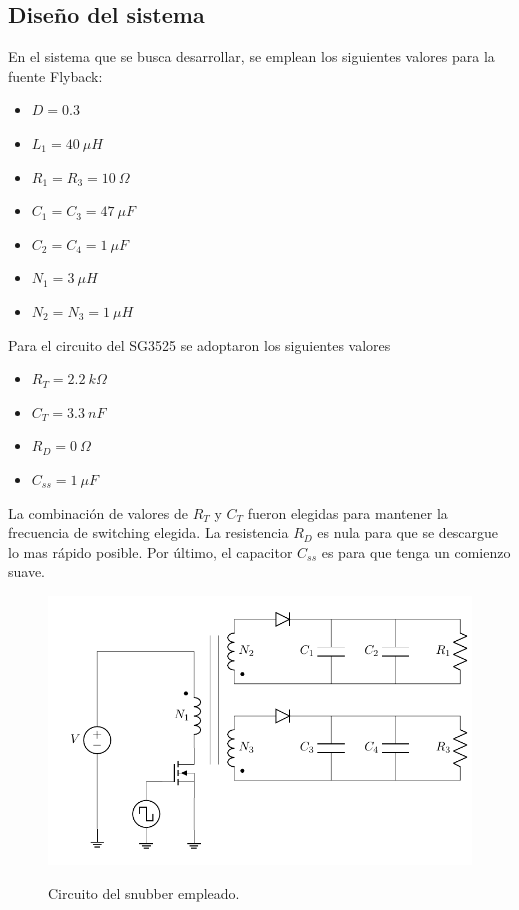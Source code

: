 %
%
%

\subsection{Diseño del sistema}

En el sistema que se busca desarrollar, se emplean los siguientes valores para la fuente Flyback:
\begin{multicols}{2}
\begin{itemize}
	\item $D = 0.3$
	\item $L_1 = 40 \ \mu H$
	\item $R_1 = R_3 = 10 \ \Omega$
	\item $C_1 = C_3 = 47 \ \mu F$
	\item $C_2 = C_4 = 1 \ \mu F$
	\item $N_1 = 3 \ \mu H$
	\item $N_2 = N_3 = 1 \ \mu H$
\end{itemize}
\end{multicols}

Para el circuito del SG3525 se adoptaron los siguientes valores
\begin{multicols}{2}
\begin{itemize}
	\item $R_T = 2.2  \ k\Omega$
	\item $C_T = 3.3 \ n F$
	\item $R_D = 0 \ \Omega$
	\item $C_{ss} = 1 \ \mu F$
\end{itemize}
\end{multicols}

La combinación de valores de $R_T$ y $C_T$ fueron elegidas para mantener la frecuencia de switching elegida. La resistencia $R_D$ es nula para que se descargue lo mas rápido posible. Por último, el capacitor $C_{ss}$ es para que tenga un comienzo suave.
\begin{figure}[H]
	\centering
	\includegraphics[width=0.7\linewidth, page = 1]{ImagenesParteII/Flyback.pdf}
	\label{fig:fly}
	\caption{Circuito del snubber empleado.}
\end{figure}

